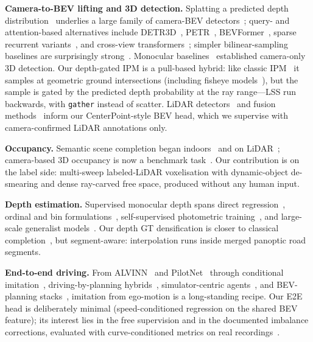 \documentclass[10pt,twocolumn]{article}
\begin{document}
\textbf{Camera-to-BEV lifting and 3D detection.} Splatting a predicted depth
distribution~\citep{philion2020lss} underlies a large family of camera-BEV
detectors~\citep{huang2021bevdet,huang2022bevdet4d,li2023bevdepth,park2023solofusion};
query- and attention-based alternatives include
DETR3D~\citep{wang2021detr3d}, PETR~\citep{liu2022petr,liu2023petrv2},
BEVFormer~\citep{li2022bevformer}, sparse recurrent
variants~\citep{lin2022sparse4d,wang2023streampetr}, and cross-view
transformers~\citep{zhou2022cvt}; simpler bilinear-sampling baselines are
surprisingly strong~\citep{harley2023simplebev,xie2022m2bev,li2023fastbev}.
Monocular baselines~\citep{wang2021fcos3d,reading2021caddn} established
camera-only 3D detection. Our depth-gated IPM is a pull-based hybrid: like
classic IPM~\citep{mallot1991ipm,bertozzi1998gold} it samples at geometric
ground intersections (including fisheye models~\citep{kannala2006generic}),
but the sample is gated by the predicted depth probability at the ray
range---LSS run backwards, with \texttt{gather} instead of scatter. LiDAR
detectors~\citep{zhou2018voxelnet,yan2018second,lang2019pointpillars,shi2019pointrcnn,shi2020pvrcnn,yin2021centerpoint}
and fusion methods~\citep{bai2022transfusion,liu2023bevfusion} inform our
CenterPoint-style BEV head, which we supervise with camera-confirmed LiDAR
annotations only.

\textbf{Occupancy.} Semantic scene completion began indoors~\citep{song2017sscnet}
and on LiDAR~\citep{behley2019semantickitti}; camera-based 3D occupancy is
now a benchmark task~\citep{cao2022monoscene,huang2023tpvformer,zhang2023occformer,wei2023surroundocc,li2023voxformer,wang2023openoccupancy,tian2023occ3d,li2023fbocc}.
Our contribution is on the label side: multi-sweep labeled-LiDAR
voxelisation with dynamic-object de-smearing and dense ray-carved free
space, produced without any human input.

\textbf{Depth estimation.} Supervised monocular depth spans direct
regression~\citep{eigen2014depth}, ordinal and bin
formulations~\citep{fu2018dorn,bhat2021adabins,lee2019bts}, self-supervised
photometric training~\citep{godard2019monodepth2}, and large-scale
generalist models~\citep{ranftl2022midas,yang2024depthanything}. Our depth GT
densification is closer to classical completion~\citep{ku2018ipbasic,ma2018sparsetodense},
but segment-aware: interpolation runs inside merged panoptic road segments.

\textbf{End-to-end driving.} From ALVINN~\citep{pomerleau1988alvinn} and
PilotNet~\citep{bojarski2016pilotnet} through conditional
imitation~\citep{codevilla2018cil,codevilla2019cilrs}, driving-by-planning
hybrids~\citep{zeng2019nmp,bansal2019chauffeurnet}, simulator-centric
agents~\citep{dosovitskiy2017carla,chen2020lbc,prakash2021transfuser,shao2022interfuser,wu2022tcp,hu2022mile},
and BEV-planning stacks~\citep{hu2022stp3,hu2023uniad,jiang2023vad},
imitation from ego-motion is a long-standing recipe. Our E2E head is
deliberately minimal (speed-conditioned regression on the shared BEV
feature); its interest lies in the free supervision and in the documented
imbalance corrections, evaluated with curve-conditioned metrics on real
recordings~\citep{caesar2020nuscenes,caesar2021nuplan}.
\end{document}
